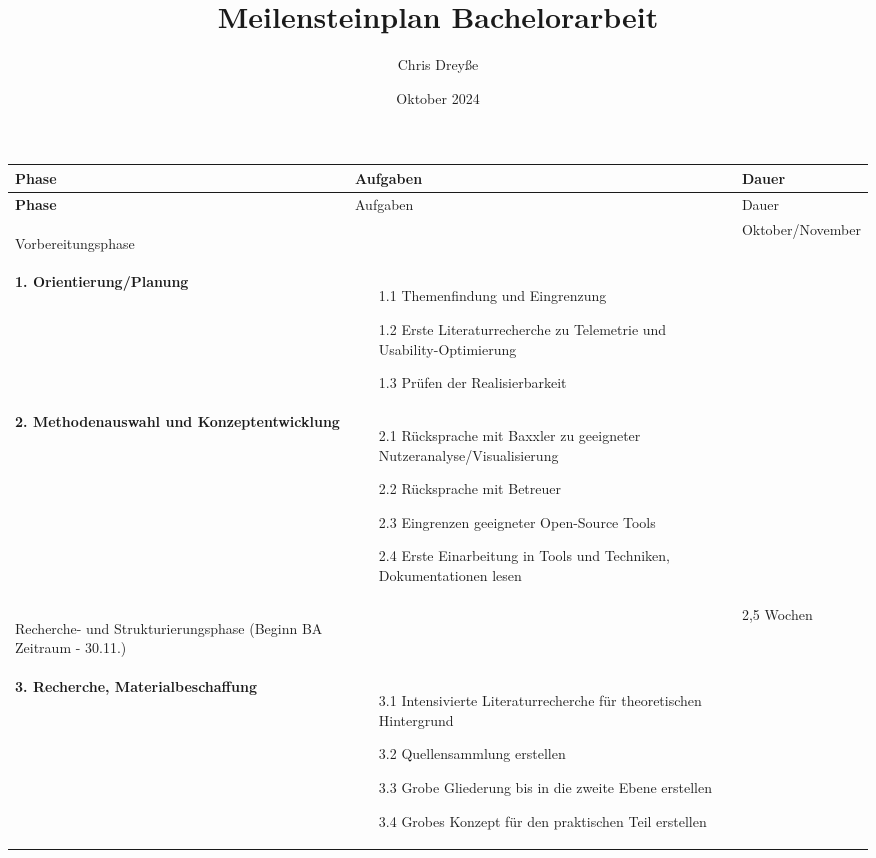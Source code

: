 \documentclass{article}
\title{\textbf{Meilensteinplan Bachelorarbeit}}
\author{Chris Dreyße}
\date{Oktober 2024}
\begin{document}
\maketitle

\begin{center}
    \begin{longtable}{>{\bfseries}p{} p{} p{}}
    \arrayrulecolor{myGreen}\hline
    \textcolor{myGreen}{Phase} & \textcolor{myGreen}{Aufgaben} & \textcolor{myGreen}{Dauer} \\ \hline
    \endfirsthead

    \hline
    \textcolor{myGreen}{Phase} & \textcolor{myGreen}{Aufgaben} & \textcolor{myGreen}{Dauer} \\ \hline
    \endhead

    Vorbereitungsphase & & Oktober/November \\ 
    1. Orientierung/Planung & 
    \begin{itemize}
        \item[1.1] Themenfindung und Eingrenzung
        \item[1.2] Erste Literaturrecherche zu Telemetrie und Usability-Optimierung
        \item[1.3] Prüfen der Realisierbarkeit
    \end{itemize} & \\ 
    
    2. Methodenauswahl und Konzeptentwicklung & 
    \begin{itemize}
        \item[2.1] Rücksprache mit Baxxler zu geeigneter Nutzeranalyse/Visualisierung
        \item[2.2] Rücksprache mit Betreuer
        \item[2.3] Eingrenzen geeigneter Open-Source Tools
        \item[2.4] Erste Einarbeitung in Tools und Techniken, Dokumentationen lesen
    \end{itemize} & \\ \hline
    
    Recherche- und Strukturierungsphase \textcolor{myGreen}{(Beginn BA Zeitraum - 30.11.)} & & 2,5 Wochen \\ 
    3. Recherche, Materialbeschaffung & 
    \begin{itemize}
        \item[3.1] Intensivierte Literaturrecherche für theoretischen Hintergrund
        \item[3.2] Quellensammlung erstellen
        \item[3.3] Grobe Gliederung bis in die zweite Ebene erstellen
        \item[3.4] Grobes Konzept für den praktischen Teil erstellen
    \end{itemize} & \\ \hline
    

\end{longtable}
\end{center}
\end{document}
